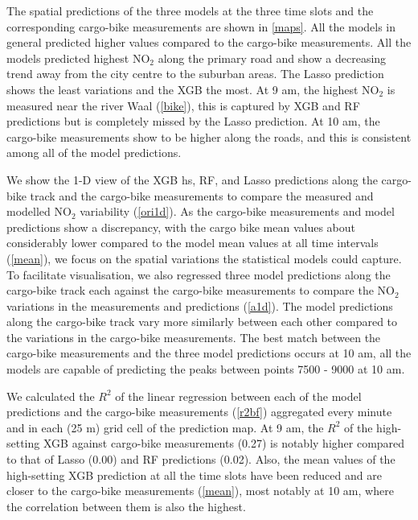 \documentclass{article}
\begin{document}
 The spatial predictions of the three models at the three time slots and the corresponding cargo-bike measurements are shown in \cref{maps}. All the models in general predicted higher values compared to the cargo-bike measurements. All the models predicted highest NO$_2$ along the primary road and show a decreasing trend away from the city centre to the suburban areas. The Lasso prediction shows the least variations and the XGB the most. At 9 am, the highest NO$_2$ is measured near the river Waal (\cref{bike}), this is captured by XGB and RF predictions but is completely missed by the Lasso prediction. At 10 am, the cargo-bike measurements show to be higher along the roads, and this is consistent among all of the model predictions.  
 
 We show the 1-D view of the XGB hs, RF, and Lasso predictions along the cargo-bike track and the cargo-bike measurements to compare the measured and modelled NO$_2$ variability (\cref{ori1d}). As the cargo-bike measurements and model predictions show a discrepancy, with the cargo bike mean values about considerably lower compared to the model mean values at all time intervals (\cref{mean}), we focus on the spatial variations the statistical models could capture. To facilitate visualisation, we also regressed three model predictions along the cargo-bike track each against the cargo-bike measurements to compare the NO$_2$ variations in the measurements and predictions (\cref{a1d}). The model predictions along the cargo-bike track vary more similarly between each other compared to the variations in the cargo-bike measurements. The best match between the cargo-bike measurements and the three model predictions occurs at 10 am, all the models are capable of predicting the peaks between points 7500 - 9000 at 10 am.  
 
 We calculated the $R^2$ of the linear regression between each of the model predictions and the cargo-bike measurements (\cref{r2bf}) aggregated every minute and in each (25 m) grid cell of the prediction map.
 At 9 am, the $R^2$ of the high-setting XGB against cargo-bike measurements (0.27) is notably higher compared to that of Lasso (0.00) and RF predictions (0.02). Also, the mean values of the high-setting XGB prediction at all the time slots have been reduced and are closer to the cargo-bike measurements (\cref{mean}), most notably at 10 am, where the correlation between them is also the highest. 
  
\end{document}
